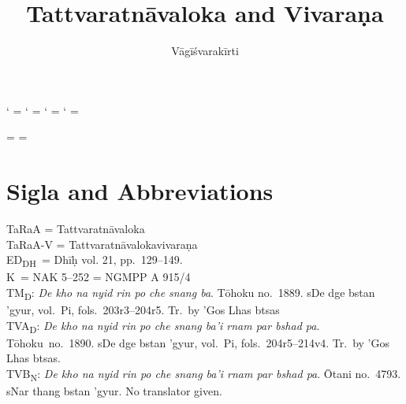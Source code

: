 \documentclass[12pt]{article}
\title{Tattvaratnāvaloka and Vivaraṇa}
\author{Vāgīśvarakīrti}
\begin{document}
\maketitle

\makeatletter
\newXeTeXintercharclass\noextraclass
\XeTeXcharclass `\? = \noextraclass
\XeTeXcharclass `\! = \noextraclass
\XeTeXcharclass `\; = \noextraclass
\XeTeXcharclass `\: = \noextraclass

 \noextraclass = {\nobreak}
\XeTeXinterchartoks {} = {\nobreak}
\makeatother

\newcommand{\PCreading}{$^{pc}$}
\newcommand{\ACreading}{$^{ac}$}
\newcommand{\MS}{K}
\newcommand{\EDD}{ED\textsubscript{DH}}
\newcommand{\TM}{TM\textsubscript{D}}
\newcommand{\TVA}{TVA\textsubscript{D}}
\newcommand{\TVB}{TVB\textsubscript{N}}
\newcommand{\TIB}{TIB}
\newcommand{\sigmareading}[1]{$\Sigma$\textsubscript{#1}}

\newcommand{\emd} {\emph{em.}}
\newcommand{\conj} {\emph{conj.}}
\newcommand{\corr} {\emph{corr.}}
\newcommand{\diag} {\emph{diag.\ conj.}}
\newcommand{\possibleemd} {\emph{possible em.}}
\newcommand{\possibleconj} {\emph{possible conj.}}

\section{Sigla and Abbreviations}
\noindent TaRaA = Tattvaratnāvaloka\\

\noindent TaRaA-V = Tattvaratnāvalokavivaraṇa\\

\noindent \EDD\ = Dhīḥ vol. 21, pp.\ 129–149.\\

\noindent \MS\ = NAK 5–252 = NGMPP A 915/4\\

\noindent \TM : \emph{De kho na nyid rin po che snang ba}. Tōhoku no.\ 1889. sDe dge bstan 'gyur, vol.\ Pi, fols.\ 203r3–204r5. Tr.\ by 'Gos Lhas btsas\\

\noindent \TVA : \emph{De kho na nyid rin po che snang ba'i rnam par bshad pa}.  Tōhoku\ no.\ 1890.  sDe dge bstan 'gyur, vol.\ Pi, fols.\ 204r5–214v4. Tr.\ by 'Gos Lhas btsas.\\

\noindent \TVB : \emph{De kho na nyid rin po che snang ba'i rnam par bshad pa}. Ōtani no.\ 4793. sNar thang bstan 'gyur. No translator given.
\end{document}
